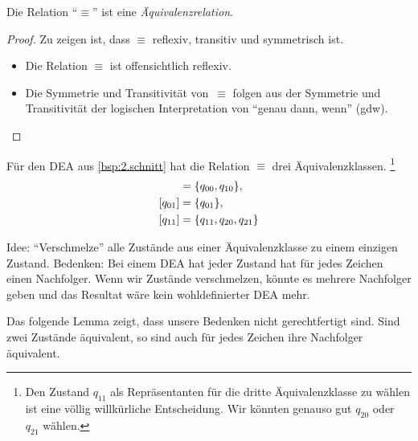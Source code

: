 \begin{lemma}[name={[$\equiv$ ist Äquivalenzrelation]}]
        Die Relation "`$\equiv$"' ist eine \emph{Äquivalenzrelation}.
\end{lemma}
\begin{proof}
  Zu zeigen ist, dass $\equiv$ reflexiv, transitiv und symmetrisch
  ist.
  \begin{itemize}
  \item Die Relation $\equiv$ ist offensichtlich reflexiv.
  \item Die Symmetrie und Transitivität von~$\equiv$ folgen aus der
    Symmetrie und Transitivität der logischen Interpretation von
    "`genau dann, wenn"' (gdw).
  \end{itemize}
\end{proof}


\begin{Bsp} 
Für den \ac{DEA} aus \autoref{bsp:2.schnitt} hat die Relation $\equiv$ drei Äquivalenzklassen.%
\footnote{Den Zustand $q_{11}$ als Repräsentanten für die dritte Äquivalenzklasse zu wählen ist eine völlig willkürliche Entscheidung. 
Wir könnten genauso gut $q_{20}$ oder $q_{21}$ wählen.}
\begin{align*}
 [q_{00}] & = \{q_{00}, q_{10}\},\\
 [q_{01}] & = \{q_{01}\},\\
 [q_{11}] & = \{q_{11}, q_{20}, q_{21}\}
 \qedhere
\end{align*}
\end{Bsp}





Idee: "`Verschmelze"' alle Zustände aus einer Äquivalenzklasse zu einem einzigen Zustand.
Bedenken: Bei einem \ac{DEA} hat jeder Zustand hat für jedes Zeichen einen Nachfolger. 
Wenn wir Zustände verschmelzen, könnte es mehrere Nachfolger geben und das Resultat wäre kein wohldefinierter \ac{DEA} mehr.

Das folgende Lemma zeigt, dass unsere Bedenken nicht gerechtfertigt sind. 
Sind zwei Zustände äquivalent, so sind auch für jedes Zeichen ihre Nachfolger äquivalent.


